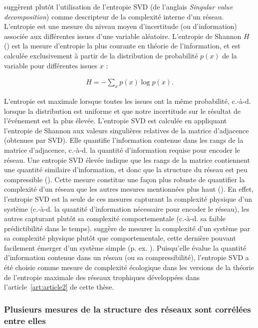 \textcite{Strydom2021Svd} suggèrent plutôt l'utilisation de l'entropie SVD (de
l'anglais \textit{Singular value decomposition}) comme descripteur de la
complexité interne d'un réseau. L'entropie est une mesure du niveau moyen
d'incertitude (ou d'information) associée aux différentes issues d'une variable
aléatoire. L'entropie de Shannon $H$ (\cite{Shannon1948Mathematical}) est la
mesure d'entropie la plus courante en théorie de l'information, et est calculée
exclusivement à partir de la distribution de probabilité $p(x)$ de la variable
pour différentes issues $x$ : 

\begin{eqnarray}
    \label{eq:shannon_intro}
            H = -\sum_{x} p(x) \log p(x).
\end{eqnarray}

L'entropie est maximale lorsque toutes les issues ont la même probabilité,
c.-à-d. lorsque la distribution est uniforme et que notre incertitude sur le
résultat de l'événement est la plus élevée. L'entropie SVD est calculée en
appliquant l'entropie de Shannon aux valeurs singulières relatives de la matrice
d'adjacence (obtenues par SVD). Elle quantifie l'information contenue dans les
rangs de la matrice d'adjacence, c.-à-d. la quantité d'information requise pour
encoder le réseau. Une entropie SVD élevée indique que les rangs de la matrice
contiennent une quantité similaire d'information, et donc que la structure du
réseau est peu compressible (\cite{Gu2016How}). Cette mesure constitue une façon
plus robuste de quantifier la complexité d'un réseau que les autres mesures
mentionnées plus haut (\cite{Strydom2021Svd}). En effet, l'entropie SVD est la
seule de ces mesures capturant la complexité physique d'un système (c.-à-d. la
quantité d'information nécessaire pour encoder le réseau), les autres capturant
plutôt sa complexité comportementale (c.-à-d. sa faible prédictibilité dans le
temps). \textcite{Adami2002What} suggère de mesurer la complexité d'un système
par sa complexité physique plutôt que comportementale, cette dernière pouvant
facilement émerger d'un système simple (p. ex. \cite{May1976Simple}).
Puisqu'elle évalue la quantité d'information contenue dans un réseau (ou sa
compressibilité), l'entropie SVD a été choisie comme mesure de complexité
écologique dans les versions de la théorie de l'entropie maximale des réseaux
trophiques développées dans l'article~\ref{art:article2} de cette thèse. 


\subsubsection{Plusieurs mesures de la structure des réseaux sont corrélées entre elles} 

